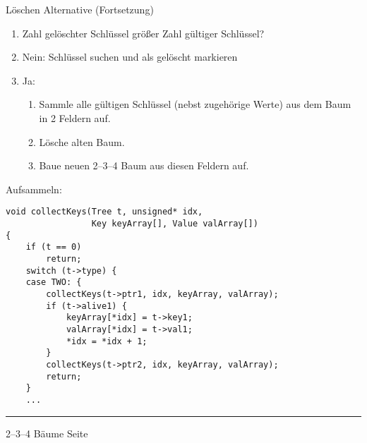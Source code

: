 
\begin{slide}{}
\normalsize

\begin{center}
L\"oschen Alternative (Fortsetzung)
\end{center}
\vspace*{0.5cm}

\footnotesize
\begin{enumerate}
\item Zahl gel\"oschter Schl\"ussel gr\"o{\ss}er Zahl g\"ultiger Schl\"ussel?
\item Nein: Schl\"ussel suchen und als gel\"oscht markieren
\item Ja:
  \begin{enumerate}
  \item Sammle alle  g\"ultigen Schl\"ussel (nebst zugeh\"orige Werte) 
        aus dem Baum in 2 Feldern auf.
  \item L\"osche alten Baum.
  \item Baue neuen 2--3--4 Baum aus diesen Feldern auf.
  \end{enumerate}
\end{enumerate}

Aufsammeln:
\begin{verbatim}
void collectKeys(Tree t, unsigned* idx, 
                 Key keyArray[], Value valArray[]) 
{
    if (t == 0)
        return;
    switch (t->type) {
    case TWO: {
        collectKeys(t->ptr1, idx, keyArray, valArray);
        if (t->alive1) {
            keyArray[*idx] = t->key1;
            valArray[*idx] = t->val1;
            *idx = *idx + 1;
        }
        collectKeys(t->ptr2, idx, keyArray, valArray);
        return;
    }
    ...
\end{verbatim}


\vspace*{\fill}
\tiny \addtocounter{mypage}{1}
\rule{17cm}{1mm}
2--3--4 B\"aume  \hspace*{\fill} Seite 
\end{slide}


